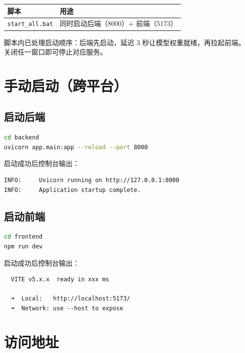 \documentclass[12pt, a4paper, openany]{ctexbook}
\begin{document}
\begin{center}
\begin{tabular}{ll}
  \toprule
  \textbf{脚本} & \textbf{用途} \\
  \midrule
  \texttt{start\_all.bat} & 同时启动后端（8000）+ 前端（5173） \\
  \bottomrule
\end{tabular}
\end{center}

\begin{tipbox}
脚本内已处理启动顺序：后端先启动，延迟 3 秒让模型权重就绪，再拉起前端。
关闭任一窗口即可停止对应服务。
\end{tipbox}

\section{手动启动（跨平台）}

\subsection{启动后端}

\begin{lstlisting}[language=bash]
cd backend
uvicorn app.main:app --reload --port 8000
\end{lstlisting}

启动成功后控制台输出：

\begin{lstlisting}
INFO:     Uvicorn running on http://127.0.0.1:8000
INFO:     Application startup complete.
\end{lstlisting}

\subsection{启动前端}

\begin{lstlisting}[language=bash]
cd frontend
npm run dev
\end{lstlisting}

启动成功后控制台输出：

\begin{lstlisting}
  VITE v5.x.x  ready in xxx ms

  ➜  Local:   http://localhost:5173/
  ➜  Network: use --host to expose
\end{lstlisting}

\section{访问地址}
\end{document}
